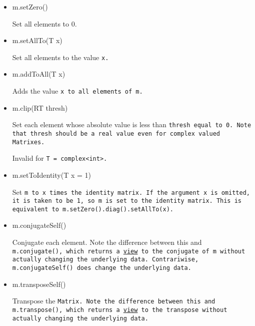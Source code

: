 \begin{itemize}

\item
\begin{tmvcode}
m.setZero()
\end{tmvcode}
Set all elements to 0.

\item
\begin{tmvcode}
m.setAllTo(T x)
\end{tmvcode}
Set all elements to the value \tt{x}.

\item
\begin{tmvcode}
m.addToAll(T x)
\end{tmvcode}
Adds the value \tt{x} to all elements of \tt{m}.

\item
\begin{tmvcode}
m.clip(RT thresh)
\end{tmvcode}
Set each element whose absolute value is less than \tt{thresh} equal to 0.
Note that \tt{thresh} should be a real value even for complex valued
\tt{Matrix}es.  

Invalid for \tt{T = complex<int>}.

\item
\begin{tmvcode}
m.setToIdentity(T x = 1)
\end{tmvcode}
Set \tt{m} to \tt{x} times the identity matrix.
If the argument \tt{x} is omitted, it is 
taken to be \tt{1}, so \tt{m} is set to the identity matrix.
This is equivalent to \tt{m.setZero().diag().setAllTo(x)}.

\item 
\begin{tmvcode}
m.conjugateSelf()
\end{tmvcode}
Conjugate each element.  Note the difference between this and \tt{m.conjugate()}, 
which returns a \underline{view} to the conjugate of \tt{m} without
actually changing the underlying data.  Contrariwise, \tt{m.conjugateSelf()}
does change the underlying data.

\item
\begin{tmvcode}
m.transposeSelf()
\end{tmvcode}
Transpose the \tt{Matrix}.  Note the difference between this and 
\tt{m.transpose()}, which returns a \underline{view} to the transpose without 
actually changing the underlying data.


\end{itemize}
